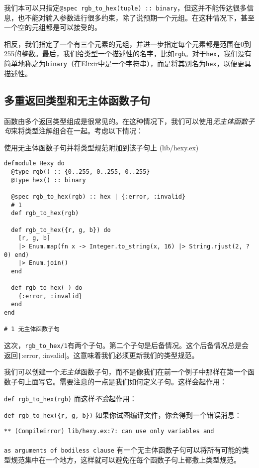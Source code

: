 我们本可以只指定\texttt{@spec rgb\_to\_hex(tuple) :: binary}，但这并不能传达很多信息，也不能对输入参数进行很多约束，除了说预期一个元组。在这种情况下，甚至一个空的元组都是可以接受的。

相反，我们指定了一个有三个元素的元组，并进一步指定每个元素都是范围在0到255的整数。最后，我们给类型一个描述性的名字，比如\texttt{rgb}。对于\texttt{hex}，我们没有简单地称之为\texttt{binary}（在Elixir中是一个字符串），而是将其别名为\texttt{hex}，以便更具描述性。

\subsection{多重返回类型和无主体函数子句}

函数由多个返回类型组成是很常见的。在这种情况下，我们可以使用\emph{无主体函数子句}来将类型注解组合在一起。考虑以下情况：

\begin{code}{使用无主体函数子句并将类型规范附加到该子句上 (lib/hexy.ex)}

\begin{verbatim}
defmodule Hexy do
  @type rgb() :: {0..255, 0..255, 0..255}
  @type hex() :: binary

  @spec rgb_to_hex(rgb) :: hex | {:error, :invalid}
  # 1
  def rgb_to_hex(rgb)

  def rgb_to_hex({r, g, b}) do
    [r, g, b]
    |> Enum.map(fn x -> Integer.to_string(x, 16) |> String.rjust(2, ?0) end)
    |> Enum.join()
  end

  def rgb_to_hex(_) do
    {:error, :invalid}
  end
end

# 1 无主体函数子句
\end{verbatim}
\end{code}


这次，\texttt{rgb\_to\_hex/1}有两个子句。第二个子句是后备情况。这个后备情况总是会返回\texttt|{:error, :invalid}|。这意味着我们必须更新我们的类型规范。

我们可以创建一个\emph{无主体}函数子句，而不是像我们在前一个例子中那样在第一个函数子句上面写它。需要注意的一点是我们如何定义子句。这样会起作用：

\texttt{def rgb\_to\_hex(rgb)}
而这样\emph{不会}起作用：

\texttt{def rgb\_to\_hex(\{r, g, b\})}
如果你试图编译文件，你会得到一个错误消息：

\texttt{** (CompileError) lib/hexy.ex:7: can use only variables and \\\\ as arguments of bodiless clause}
有一个无主体函数子句可以将所有可能的类型规范集中在一个地方，这样就可以避免在每个函数子句上都撒上类型规范。


